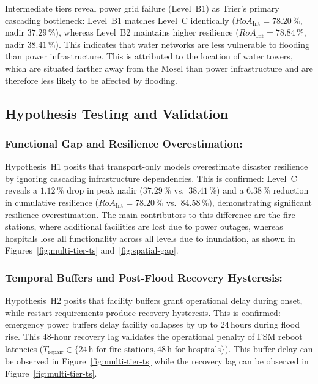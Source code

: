 \noindent
Intermediate tiers reveal power grid failure (Level~B1) as Trier's primary cascading bottleneck: Level~B1 matches Level~C identically ($RoA_{\text{Int}} = 78.20\,\%$, nadir $37.29\,\%$), whereas Level~B2 maintains higher resilience ($RoA_{\text{Int}} = 78.84\,\%$, nadir $38.41\,\%$).
This indicates that water networks are less vulnerable to flooding than power infrastructure.
This is attributed to the location of water towers, which are situated farther away from the Mosel than power infrastructure and are therefore less likely to be affected by flooding.


\subsection{Hypothesis Testing and Validation}
\label{subsec:hypothesis-testing}

\subsubsection{Functional Gap and Resilience Overestimation:}
Hypothesis~H1 posits that transport-only models overestimate disaster resilience by ignoring cascading infrastructure dependencies.
This is confirmed: Level~C reveals a $1.12\,\%$ drop in peak nadir ($37.29\,\%$ vs.\ $38.41\,\%$) and a $6.38\,\%$ reduction in cumulative resilience ($RoA_{\text{Int}} = 78.20\,\%$ vs.\ $84.58\,\%$), demonstrating significant resilience overestimation.
The main contributors to this difference are the fire stations, where additional facilities are lost due to power outages, whereas hospitals lose all functionality across all levels due to inundation, as shown in Figures~\ref{fig:multi-tier-ts} and~\ref{fig:spatial-gap}.

\subsubsection{Temporal Buffers and Post-Flood Recovery Hysteresis:}
Hypothesis~H2 posits that facility buffers grant operational delay during onset, while restart requirements produce recovery hysteresis.
This is confirmed: emergency power buffers delay facility collapses by up to $24\,\text{hours}$ during flood rise.
This 48-hour recovery lag validates the operational penalty of FSM reboot latencies ($T_{\text{repair}} \in \{24\,\text{h for fire stations}, 48\,\text{h for hospitals}\}$).
This buffer delay can be observed in Figure~\ref{fig:multi-tier-ts} while the recovery lag can be observed in Figure~\ref{fig:multi-tier-ts}.

